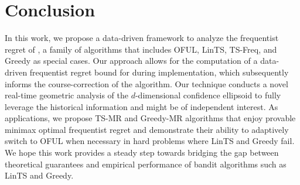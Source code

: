 \section{Conclusion}
\label{sec:conclusion}

In this work, we propose a data-driven framework to analyze the frequentist regret of \POFUL{}, a family of algorithms that includes OFUL, LinTS, TS-Freq, and Greedy as special cases. Our approach allows for the computation of a data-driven frequentist regret bound for \POFUL{} during implementation, which subsequently informs the course-correction of the algorithm. Our technique conducts a novel real-time geometric analysis of the $d$-dimensional confidence ellipsoid to fully leverage the historical information and might be of independent interest. As applications, we propose TS-MR and Greedy-MR algorithms that enjoy provable minimax optimal frequentist regret and demonstrate their ability to adaptively switch to OFUL when necessary in hard problems where LinTS and Greedy fail. We hope this work provides a steady step towards bridging the gap between theoretical guarantees and empirical performance of bandit algorithms such as LinTS and Greedy.